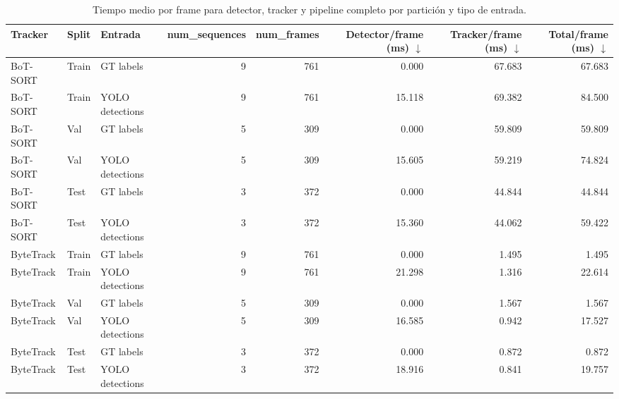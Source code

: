 \begin{table}
\caption{Tiempo medio por frame para detector, tracker y pipeline completo por partición y tipo de entrada.}
\label{tab:tracking_timing_by_split_source}
\begin{tabular}{lllrrrrr}
\toprule
Tracker & Split & Entrada & num_sequences & num_frames & Detector/frame (ms) $\downarrow$ & Tracker/frame (ms) $\downarrow$ & Total/frame (ms) $\downarrow$ \\
\midrule
BoT-SORT & Train & GT labels & 9 & 761 & 0.000 & 67.683 & 67.683 \\
BoT-SORT & Train & YOLO detections & 9 & 761 & 15.118 & 69.382 & 84.500 \\
BoT-SORT & Val & GT labels & 5 & 309 & 0.000 & 59.809 & 59.809 \\
BoT-SORT & Val & YOLO detections & 5 & 309 & 15.605 & 59.219 & 74.824 \\
BoT-SORT & Test & GT labels & 3 & 372 & 0.000 & 44.844 & 44.844 \\
BoT-SORT & Test & YOLO detections & 3 & 372 & 15.360 & 44.062 & 59.422 \\
ByteTrack & Train & GT labels & 9 & 761 & 0.000 & 1.495 & 1.495 \\
ByteTrack & Train & YOLO detections & 9 & 761 & 21.298 & 1.316 & 22.614 \\
ByteTrack & Val & GT labels & 5 & 309 & 0.000 & 1.567 & 1.567 \\
ByteTrack & Val & YOLO detections & 5 & 309 & 16.585 & 0.942 & 17.527 \\
ByteTrack & Test & GT labels & 3 & 372 & 0.000 & 0.872 & 0.872 \\
ByteTrack & Test & YOLO detections & 3 & 372 & 18.916 & 0.841 & 19.757 \\
\bottomrule
\end{tabular}
\end{table}
